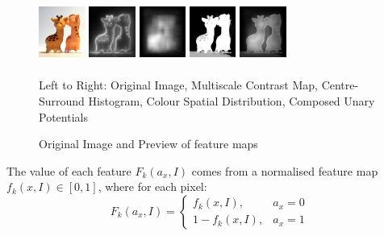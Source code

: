 \documentclass[10pt,twocolumn,letterpaper]{article}
\begin{document}
\begin{figure}[h]
    \begin{center} %
    \includegraphics[width=0.6in,height=0.8in]{./Figures/previews/raw.jpg}
    \includegraphics[width=0.6in,height=0.8in]{./Figures/previews/MC.jpg}
    \includegraphics[width=0.6in,height=0.8in]{./Figures/previews/CSH.jpg} 
    \includegraphics[width=0.6in,height=0.8in]{./Figures/previews/CSD.jpg} 
    \includegraphics[width=0.6in,height=0.8in]{./Figures/previews/Composed.jpg} \\
    \caption{Original Image and Preview of feature maps}\vspace{1mm}
       \small Left to Right: Original Image, Multiscale Contrast Map, Centre-Surround Histogram, Colour Spatial Distribution, Composed Unary Potentials
\end{center}
\end{figure}

The value of each feature $F_k(a_x,I)$ comes from a normalised feature map $f_k(x,I)\in[0,1]$, where for each pixel: $$F_k(a_x,I) = \left\{\begin{matrix}f_k(x,I), & a_x=0\\1-f_k(x,I), & a_x=1\end{matrix}\right.$$
\end{document}
